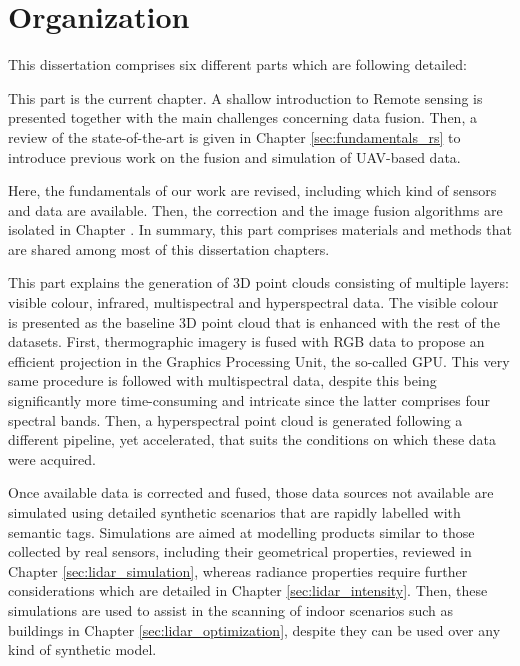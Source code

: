 \section{Organization}

This dissertation comprises six different parts which are following detailed:

\small {} \normalsize\hspace{3mm} This part is the current chapter. A shallow introduction to \gls{Remote sensing} is presented together with the main challenges concerning data fusion. Then, a review of the state-of-the-art is given in Chapter \ref{sec:fundamentals_rs} to introduce previous work on the fusion and simulation of UAV-based data.

\small {} \normalsize\hspace{3mm} Here, the fundamentals of our work are revised, including which kind of sensors and data are available. Then, the correction and the image fusion algorithms are isolated in Chapter . In summary, this part comprises materials and methods that are shared among most of this dissertation chapters.

\small {} \normalsize\hspace{3mm} This part explains the generation of 3D point clouds consisting of multiple layers: visible colour, infrared, multispectral and hyperspectral data. The visible colour is presented as the baseline 3D point cloud that is enhanced with the rest of the datasets. First, thermographic imagery is fused with RGB data to propose an efficient projection in the Graphics Processing Unit, the so-called GPU. This very same procedure is followed with multispectral data, despite this being significantly more time-consuming and intricate since the latter comprises four spectral bands. Then, a hyperspectral point cloud is generated following a different pipeline, yet accelerated, that suits the conditions on which these data were acquired.  

\small {} \normalsize\hspace{3mm} Once available data is corrected and fused, those data sources not available are simulated using detailed synthetic scenarios that are rapidly labelled with semantic tags. Simulations are aimed at modelling products similar to those collected by real sensors, including their geometrical properties, reviewed in Chapter \ref{sec:lidar_simulation}, whereas radiance properties require further considerations which are detailed in Chapter \ref{sec:lidar_intensity}. Then, these simulations are used to assist in the scanning of indoor scenarios such as buildings in Chapter \ref{sec:lidar_optimization}, despite they can be used over any kind of synthetic model. 

